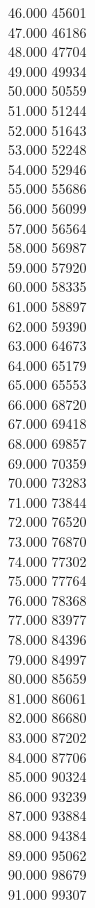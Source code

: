 { 46.000	45601 \\
 47.000	46186 \\
 48.000	47704 \\
 49.000	49934 \\
 50.000	50559 \\
 51.000	51244 \\
 52.000	51643 \\
 53.000	52248 \\
 54.000	52946 \\
 55.000	55686 \\
 56.000	56099 \\
 57.000	56564 \\
 58.000	56987 \\
 59.000	57920 \\
 60.000	58335 \\
 61.000	58897 \\
 62.000	59390 \\
 63.000	64673 \\
 64.000	65179 \\
 65.000	65553 \\
 66.000	68720 \\
 67.000	69418 \\
 68.000	69857 \\
 69.000	70359 \\
 70.000	73283 \\
 71.000	73844 \\
 72.000	76520 \\
 73.000	76870 \\
 74.000	77302 \\
 75.000	77764 \\
 76.000	78368 \\
 77.000	83977 \\
 78.000	84396 \\
 79.000	84997 \\
 80.000	85659 \\
 81.000	86061 \\
 82.000	86680 \\
 83.000	87202 \\
 84.000	87706 \\
 85.000	90324 \\
 86.000	93239 \\
 87.000	93884 \\
 88.000	94384 \\
 89.000	95062 \\
 90.000	98679 \\
 91.000	99307 \\
}
